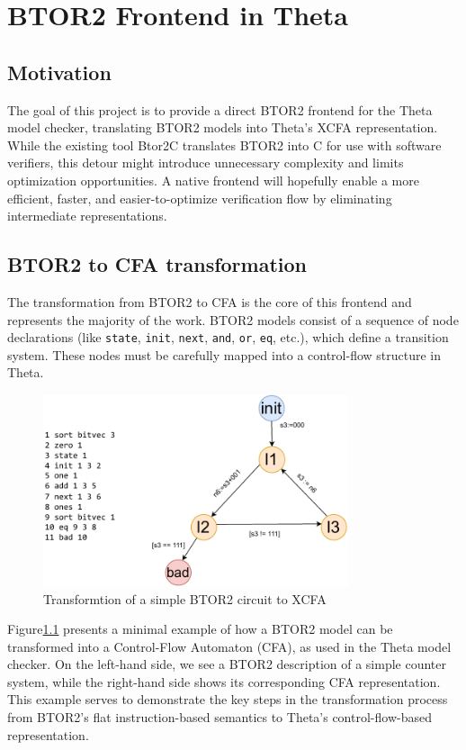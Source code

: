 \chapter{BTOR2 Frontend in Theta}

\section{Motivation}
The goal of this project is to provide a direct BTOR2 frontend for the Theta model checker, translating BTOR2 models into Theta’s XCFA representation. While the existing tool Btor2C translates BTOR2 into C for use with software verifiers, this detour might introduce unnecessary complexity and limits optimization opportunities.\cite{btor2c} A native frontend will hopefully enable a more efficient, faster, and easier-to-optimize verification flow by eliminating intermediate representations.

\section{BTOR2 to CFA transformation}
The transformation from BTOR2 to CFA is the core of this frontend and represents the majority of the work. BTOR2 models consist of a sequence of node declarations (like \verb*|state|, \verb*|init|, \verb*|next|, \verb*|and|, \verb*|or|, \verb*|eq|, etc.), which define a transition system. These nodes must be carefully mapped into a control-flow structure in Theta.

\begin{figure}
  \centering
  \includegraphics[width=0.8\textwidth]{figures/count2_cfa_code.pdf}
  \caption{ Transformtion of a simple BTOR2 circuit to XCFA }
  \label{fig:count2_cfa_code}
\end{figure}

Figure\ref{fig:count2_cfa_code} presents a minimal example of how a BTOR2 model can be transformed into a Control-Flow Automaton (CFA), as used in the Theta model checker. On the left-hand side, we see a BTOR2 description of a simple counter system, while the right-hand side shows its corresponding CFA representation. This example serves to demonstrate the key steps in the transformation process from BTOR2's flat instruction-based semantics to Theta's control-flow-based representation.

